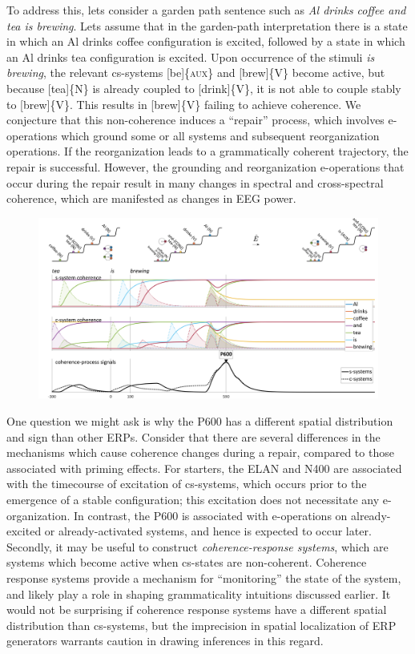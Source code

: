   To address this, lets consider a garden path sentence such as \textit{Al drinks coffee and tea is brewing}. Lets assume that in the garden-path interpretation there is a state in which an {\textbar}Al drinks coffee{\textbar} configuration is excited, followed by a state in which an {\textbar}Al drinks tea{\textbar} configuration is excited. Upon occurrence of the stimuli \textit{is brewing}, the relevant cs-systems [be]\{\textsc{aux}\} and [brew]\{V\} become active, but because [tea]\{N\} is already coupled to [drink]\{V\}, it is not able to couple stably to [brew]\{V\}. This results in [brew]\{V\} failing to achieve coherence. We conjecture that this non-coherence induces a “repair” process, which involves e-operations which ground some or all systems and subsequent reorganization operations. If the reorganization leads to a grammatically coherent trajectory, the repair is successful. However, the grounding and reorganization e-operations that occur during the repair result in many changes in spectral and cross-spectral coherence, which are manifested as changes in EEG power. 

  
\begin{figure}
\includegraphics[width=\textwidth]{figures/Tilsen-img144.png}
\caption{\missingcaption}
\label{fig:6:25}
\end{figure}
 

One question we might ask is why the P600 has a different spatial distribution and sign than other ERPs. Consider that there are several differences in the mechanisms which cause coherence changes during a repair, compared to those associated with priming effects. For starters, the ELAN and N400 are associated with the timecourse of excitation of cs-systems, which occurs prior to the emergence of a stable configuration; this excitation does not necessitate any e-organization. In contrast, the P600 is associated with e-operations on already-excited or already-activated systems, and hence is expected to occur later. Secondly, it may be useful to construct \textit{coherence-response systems}, which are systems which become active when cs-states are non-coherent. Coherence response systems provide a mechanism for “monitoring” the state of the system, and likely play a role in shaping grammaticality intuitions discussed earlier. It would not be surprising if coherence response systems have a different spatial distribution than cs-systems, but the imprecision in spatial localization of ERP generators warrants caution in drawing inferences in this regard.


